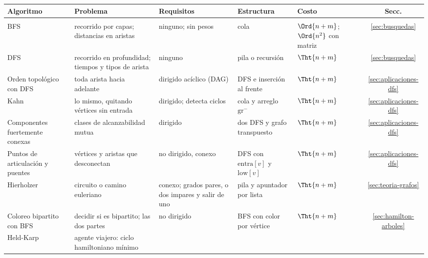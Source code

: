 \documentclass[11pt,letterpaper]{article}
\begin{document}
\begingroup
\small
\setlength{\tabcolsep}{4pt}
\begin{center}
\begin{tabular}{@{}>{\raggedright\arraybackslash}p{2.5cm}%
                >{\raggedright\arraybackslash}p{3.3cm}%
                >{\raggedright\arraybackslash}p{3.1cm}%
                >{\raggedright\arraybackslash}p{2.7cm}%
                >{\raggedright\arraybackslash}p{2.9cm}c@{}}
  \toprule
  \textbf{Algoritmo} & \textbf{Problema} & \textbf{Requisitos}
    & \textbf{Estructura} & \textbf{Costo} & \textbf{Secc.} \\
  \midrule
  \multicolumn{6}{@{}l}{\textit{Recorridos y estructura del grafo}} \\
  \addlinespace[2pt]
  BFS & recorrido por capas; distancias en aristas
      & ninguno; sin pesos
      & cola & $\Ord{n + m}$; $\Ord{n^2}$ con matriz
      & \ref{sec:busquedas} \\
  \addlinespace
  DFS & recorrido en profundidad; tiempos y tipos de arista
      & ninguno & pila o recursión & $\Tht{n + m}$
      & \ref{sec:busquedas} \\
  \addlinespace
  Orden topológico con DFS & toda arista hacia adelante
      & dirigido acíclico (DAG)
      & DFS e inserción al frente & $\Tht{n + m}$
      & \ref{sec:aplicaciones-dfs} \\
  \addlinespace
  Kahn & lo mismo, quitando vértices sin entrada
      & dirigido; detecta ciclos
      & cola y arreglo $\text{gr}^{-}$ & $\Tht{n + m}$
      & \ref{sec:aplicaciones-dfs} \\
  \addlinespace
  Componentes fuertemente conexas & clases de alcanzabilidad mutua
      & dirigido & dos DFS y grafo transpuesto & $\Tht{n + m}$
      & \ref{sec:aplicaciones-dfs} \\
  \addlinespace
  Puntos de articulación y puentes & vértices y aristas que
        desconectan
      & no dirigido, conexo
      & DFS con $\text{entra}[v]$ y $\text{low}[v]$ & $\Tht{n + m}$
      & \ref{sec:aplicaciones-dfs} \\
  \addlinespace
  Hierholzer & circuito o camino euleriano
      & conexo; grados pares, o dos impares y salir de uno
      & pila y apuntador por lista & $\Tht{n + m}$
      & \ref{sec:teoria-grafos} \\
  \addlinespace
  Coloreo bipartito con BFS & decidir si es bipartito; las dos partes
      & no dirigido & BFS con color por vértice & $\Tht{n + m}$
      & \ref{sec:hamilton-arboles} \\
  \addlinespace
  Held-Karp & agente viajero: ciclo hamiltoniano mínimo

\end{tabular}
\end{center}
\end{document}
